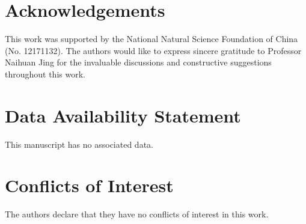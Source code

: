 \documentclass[12pt,reqno]{amsart}
\numberwithin{equation}{section}
\begin{document}
 


\section*{Acknowledgements}
This work was supported by the National Natural Science Foundation of China (No. 12171132). The authors would like to express sincere gratitude to Professor Naihuan Jing for the invaluable discussions and constructive suggestions throughout this work.


\section*{Data Availability Statement}
This manuscript has no associated data.

\section*{Conflicts of Interest} The authors declare that they have no conflicts of interest in this work.
\end{document}
